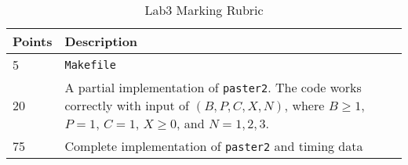\begin{table}[ht]
\begin{center}
\begin{tabular} {|p{4cm}|p{12cm}|} \hline
Points &Description  \\ \hline
5  & \verb+Makefile+\\ \hline
20 & A partial implementation of \verb+paster2+. The code works correctly with input of $(B, P, C, X, N)$, where $B \ge 1$, $P = 1$, $C = 1$, $X \ge 0$, and $N = 1, 2, 3$. \\ \hline
75    & Complete implementation of \verb+paster2+ and timing data\\ \hline
\end{tabular}
\caption{Lab3 Marking Rubric}
\label{tb_lab3_ipc_rubric}
\end{center}
\end{table}



